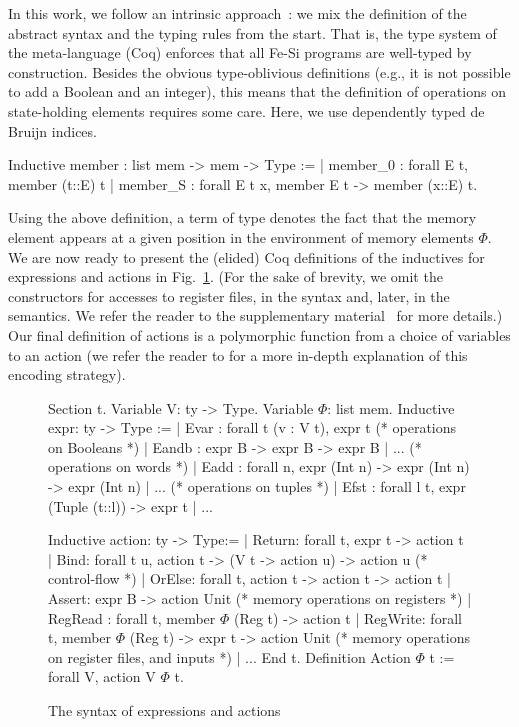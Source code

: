 \documentclass{llncs}
\begin{document}
In this work, we follow an intrinsic
approach~\cite{DBLP:journals/jar/BentonHKM12}: we mix the definition
of the abstract syntax and the typing rules from the start. That is,
the type system of the meta-language (Coq) enforces that all Fe-Si
programs are well-typed by construction.
%
Besides the obvious type-oblivious definitions (e.g., it is not
possible to add a Boolean and an integer), this means that the
definition of operations on state-holding elements requires some care.
%
Here, we use dependently typed de Bruijn indices. 
\begin{mcoq}
Inductive member : list mem -> mem ->  Type :=
| member_0 : forall E t, member (t::E) t
| member_S : forall E t x, member E t -> member (x::E) t.
\end{mcoq}
Using the above definition, a term of type  denotes
the fact that the memory element  appears at a given position
in the environment of memory elements $\Phi$. 
%
We are now ready to present the (elided) Coq definitions of the
inductives for expressions and actions in Fig.~\ref{fig:fesi}.
%
(For the sake of brevity, we omit the constructors for accesses to
register files, in the syntax and, later, in the semantics. We refer
the reader to the supplementary material~\cite{fesi} for more details.)
%
Our final definition  of actions is a polymorphic
function from a choice of variables to an action (we refer the reader
to \cite{phoas-chlipala} for a more in-depth explanation of this
encoding strategy).

\begin{figure}[t]
  \centering
\begin{coq}
Section t. 
  Variable V: ty -> Type. Variable $\Phi$: list mem. 
  Inductive expr: ty -> Type :=
  | Evar : forall t (v : V t), expr t
  (* operations on Booleans *)
  | Eandb : expr B -> expr B -> expr B | ... 
  (* operations on words *)
  | Eadd : forall n, expr (Int n) -> expr (Int n) -> expr (Int n) | ... 
  (* operations on tuples *)
  | Efst : forall l t, expr (Tuple (t::l)) -> expr t | ...

  Inductive action: ty -> Type:=
  | Return: forall t, expr t -> action t
  | Bind: forall t u,  action  t -> (V t -> action u) -> action u
  (* control-flow *)
  | OrElse: forall t, action t -> action t -> action t
  | Assert: expr B -> action Unit    
  (* memory operations on registers *)
  | RegRead : forall t, member $\Phi$ (Reg t) -> action t
  | RegWrite: forall t, member $\Phi$ (Reg t) -> expr t -> action Unit
  (* memory operations on register files, and inputs *)
  | ... 
End t. 
Definition Action $\Phi$ t := forall V, action V $\Phi$ t.  
\end{coq}
  \caption{The syntax of expressions and actions}
  \label{fig:fesi}
\end{figure}
\end{document}
